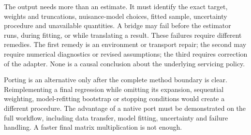 The output needs more than an estimate. It must identify the exact target,
weights and truncations, nuisance-model choices, fitted sample, uncertainty
procedure and unavailable quantities. A bridge may fail before the estimator
runs, during fitting, or while translating a result. These failures require
different remedies. The first remedy is an environment or transport repair;
the second may require numerical diagnostics or revised assumptions; the
third requires correction of the adapter. None is a causal conclusion about
the underlying servicing policy.

Porting is an alternative only after the complete method boundary is clear.
Reimplementing a final regression while omitting its expansion, sequential
weighting, model-refitting bootstrap or stopping conditions would create a
different procedure. The advantage of a native port must be demonstrated on
the full workflow, including data transfer, model fitting, uncertainty and
failure handling. A faster final matrix multiplication is not enough.


